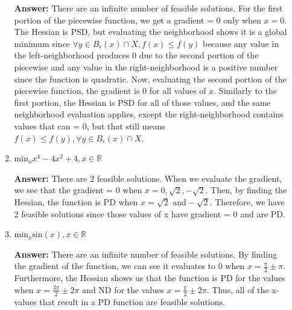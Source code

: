 \documentclass{assignment}
\newcommand{\R}{\mathbb{R}}
\begin{document}
\begin{problem}
\begin{enumerate}
\begin{enumerate}[label=(\alph*)]
        \color{blue}\textbf{Answer:} There are an infinite number of feasible solutions. For the first portion of the piecewise function, we get a gradient = 0 only when $x = 0$. The Hessian is PSD, but evaluating the neighborhood shows it is a global minimum since $\forall y \in B_\epsilon(x) \cap X, f(x) \leq f(y)$ because any value in the left-neighborhood produces 0 due to the second portion of the piecewise and any value in the right-neighborhood is a positive number since the function is quadratic. Now, evaluating the second portion of the piecewise function, the gradient is 0 for all values of $x$. Similarly to the first portion, the Hessian is PSD for all of those values, and the same neighborhood evaluation applies, except the right-neighborhood contains values that can = 0, but that still means $f(x) \leq f(y), \forall y \in B_\epsilon(x) \cap X$.\color{black}



        \item $\text{min}_x x^4 - 4x^2 + 4, x \in \R$

        \color{blue}\textbf{Answer:} There are 2 feasible solutions. When we evaluate the gradient, we see that the gradient = 0 when $x = 0, \sqrt{2}, -\sqrt{2}$. Then, by finding the Hessian, the function is PD when $x = \sqrt{2} \text{ and} -\sqrt{2}$. Therefore, we have 2 feasible solutions since those values of x have gradient = 0 and are PD. \color{black}


        
        \item $\text{min}_x \text{sin}(x), x \in \R$

        \color{blue}\textbf{Answer:} There are an infinite number of feasible solutions. By finding the gradient of the function, we can see it evaluates to 0 when $x = \frac{\pi}{2} \pm \pi$. Furthermore, the Hessian shows us that the function is PD for the values when $x = \frac{3\pi}{2} \pm 2\pi$ and ND for the values $x = \frac{\pi}{2} \pm 2\pi$. Thus, all of the x-values that result in a PD function are feasible solutions. \color{black}


\end{enumerate}
\end{enumerate}
\end{problem}
\end{document}
